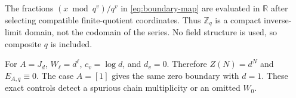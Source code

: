 \begin{remark}
The fractions \((x\bmod q^v)/q^v\) in \eqref{eq:boundary-map} are evaluated
in \(\mathbb R\) after selecting compatible finite-quotient coordinates.
Thus \(\mathbb Z_q\) is a compact inverse-limit domain, not the codomain of
the series.  No field structure is used, so composite \(q\) is included.
\end{remark}

\begin{remark}
For \(A=J_d\), \(W_\ell=d^\ell\), \(c_v=\log d\), and \(d_v=0\).
Therefore \(Z(N)=d^N\) and \(E_{A,q}\equiv0\).  The case \(A=[1]\) gives
the same zero boundary with \(d=1\).  These exact controls detect a spurious
chain multiplicity or an omitted \(W_0\).
\end{remark}
